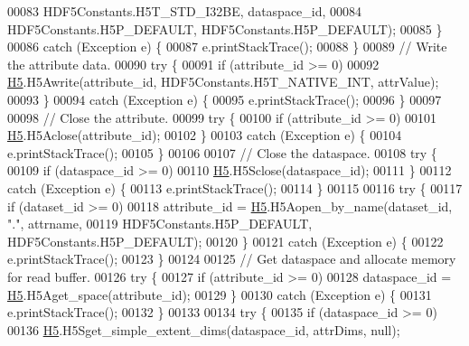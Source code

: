 \begin{DoxyCode}
00083                         HDF5Constants.H5T\_STD\_I32BE, dataspace\_id,
00084                         HDF5Constants.H5P\_DEFAULT, HDF5Constants.H5P\_DEFAULT);
00085         \}
00086         \textcolor{keywordflow}{catch} (Exception e) \{
00087             e.printStackTrace();
00088         \}
00089         \textcolor{comment}{// Write the attribute data.}
00090         \textcolor{keywordflow}{try} \{
00091             \textcolor{keywordflow}{if} (attribute\_id >= 0)
00092                 \hyperlink{namespace_h5}{H5}.H5Awrite(attribute\_id, HDF5Constants.H5T\_NATIVE\_INT, attrValue);
00093         \}
00094         \textcolor{keywordflow}{catch} (Exception e) \{
00095             e.printStackTrace();
00096         \}
00097 
00098         \textcolor{comment}{// Close the attribute.}
00099         \textcolor{keywordflow}{try} \{
00100             \textcolor{keywordflow}{if} (attribute\_id >= 0)
00101                 \hyperlink{namespace_h5}{H5}.H5Aclose(attribute\_id);
00102         \}
00103         \textcolor{keywordflow}{catch} (Exception e) \{
00104             e.printStackTrace();
00105         \}
00106 
00107         \textcolor{comment}{// Close the dataspace.}
00108         \textcolor{keywordflow}{try} \{
00109             \textcolor{keywordflow}{if} (dataspace\_id >= 0)
00110                 \hyperlink{namespace_h5}{H5}.H5Sclose(dataspace\_id);
00111         \}
00112         \textcolor{keywordflow}{catch} (Exception e) \{
00113             e.printStackTrace();
00114         \}
00115 
00116         \textcolor{keywordflow}{try} \{
00117             \textcolor{keywordflow}{if} (dataset\_id >= 0)
00118                 attribute\_id = \hyperlink{namespace_h5}{H5}.H5Aopen\_by\_name(dataset\_id, \textcolor{stringliteral}{"."}, attrname,
00119                         HDF5Constants.H5P\_DEFAULT, HDF5Constants.H5P\_DEFAULT);
00120         \}
00121         \textcolor{keywordflow}{catch} (Exception e) \{
00122             e.printStackTrace();
00123         \}
00124 
00125         \textcolor{comment}{// Get dataspace and allocate memory for read buffer.}
00126         \textcolor{keywordflow}{try} \{
00127             \textcolor{keywordflow}{if} (attribute\_id >= 0)
00128                 dataspace\_id = \hyperlink{namespace_h5}{H5}.H5Aget\_space(attribute\_id);
00129         \}
00130         \textcolor{keywordflow}{catch} (Exception e) \{
00131             e.printStackTrace();
00132         \}
00133 
00134         \textcolor{keywordflow}{try} \{
00135             \textcolor{keywordflow}{if} (dataspace\_id >= 0)
00136                 \hyperlink{namespace_h5}{H5}.H5Sget\_simple\_extent\_dims(dataspace\_id, attrDims, null);

\end{DoxyCode}
